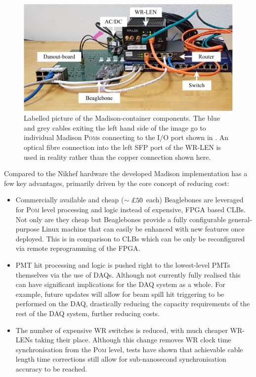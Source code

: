 \begin{figure} %
    \includegraphics[width=\textwidth]{diagrams/5-daq/madison_box.pdf}
    \caption[Labelled picture of the Madison-container components]
    {Labelled picture of the Madison-container components. The blue and grey cables exiting the
        left hand side of the image go to individual Madison \textsc{Pom}s connecting to the I/O
        port shown in . An optical fibre connection into the left SFP
        port of the WR-LEN is used in reality rather than the copper connection shown here.}
    \label{fig:madison_box}
\end{figure}

Compared to the Nikhef hardware the \chips developed Madison implementation has a few key
advantages, primarily driven by the core \chips concept of reducing cost:
\begin{itemize}
    \item Commercially available and cheap ($\sim\text{\textsterling}50$ each) Beaglebones are
    leveraged for \textsc{Pom} level processing and logic instead of expensive, FPGA based CLBs.
    Not only are they cheap but Beaglebones provide a fully configurable general-purpose Linux
    machine that can easily be enhanced with new features once deployed. This is in comparison to
    CLBs which can be only be reconfigured via remote reprogramming of the FPGA.

    \item PMT hit processing and logic is pushed right to the lowest-level PMTs themselves via the
    use of \si{\micro}DAQs. Although not currently fully realised this can have significant
    implications for the DAQ system as a whole. For example, future updates will allow for beam
    spill hit triggering to be performed on the \si{\micro}DAQ, drastically reducing the capacity
    requirements of the rest of the DAQ system, further reducing costs.

    \item The number of expensive WR switches is reduced, with much cheaper WR-LENs taking their
    place. Although this change removes WR clock time synchronisation from the \textsc{Pom} level,
    tests have shown that achievable cable length time corrections still allow for sub-nanosecond
    synchronisation accuracy to be reached.
\end{itemize}


